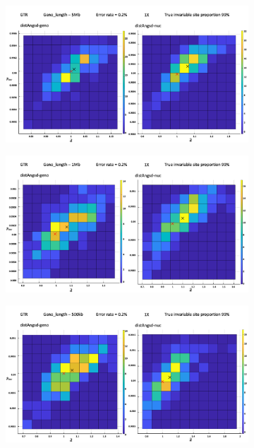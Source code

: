 \documentclass{article}
\begin{document}
\begin{figure}
\begin{subfigure}{.5\textwidth}
  \centering
  \includegraphics[width=.99\linewidth]{5M99.png}  
  \caption{}
  \label{fig:2D99s1}
\end{subfigure}
\begin{subfigure}{.5\textwidth}
  \centering
  \includegraphics[width=.99\linewidth]{1M99.png}  
  \caption{}
  \label{fig:2D99s2}
\end{subfigure}
\newline
\begin{subfigure}{.5\textwidth}
  \centering
  \includegraphics[width=.99\linewidth]{500k99.png}  

\end{subfigure}
\end{figure}
\end{document}
